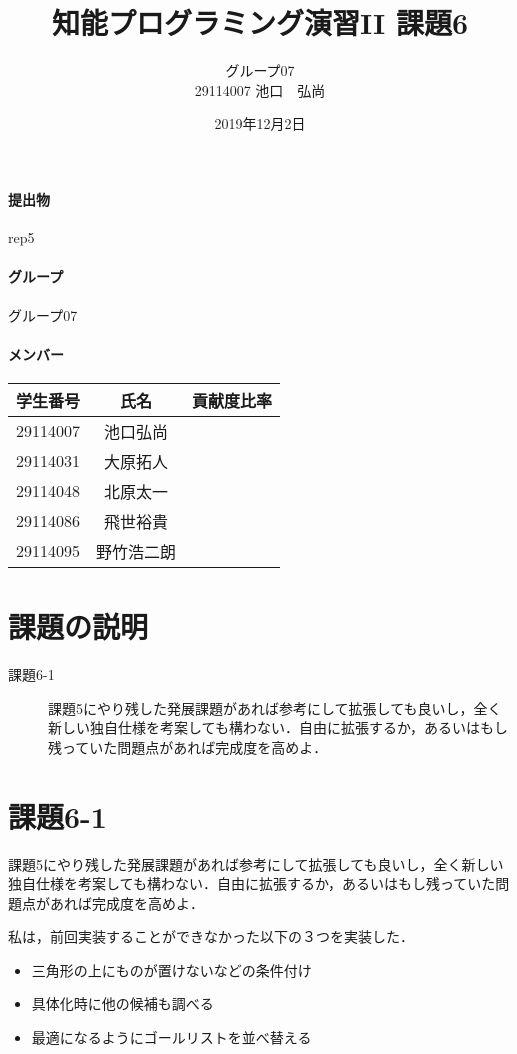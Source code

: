 \documentclass{jarticle}
\title{知能プログラミング演習II 課題6}
\author{グループ07\\
  29114007 池口　弘尚\\
}
\date{2019年12月2日}
\begin{document}
\maketitle

\paragraph{提出物} rep5
\paragraph{グループ} グループ07
\paragraph{メンバー}
\begin{tabular}{|c|c|c|}
  \hline
  学生番号&氏名&貢献度比率\\
  \hline\hline
  29114007&池口弘尚&\\
  \hline
  29114031&大原拓人&\\
  \hline
  29114048&北原太一&\\
  \hline
  29114086&飛世裕貴&\\
  \hline
  29114095&野竹浩二朗&\\
\end{tabular}

\section{課題の説明}
\begin{description}
\item[課題6-1] 課題5にやり残した発展課題があれば参考にして拡張しても良いし，全く新しい独自仕様を考案しても構わない．自由に拡張するか，あるいはもし残っていた問題点があれば完成度を高めよ．
\end{description}

\section{課題6-1}
\begin{screen}
課題5にやり残した発展課題があれば参考にして拡張しても良いし，全く新しい独自仕様を考案しても構わない．自由に拡張するか，あるいはもし残っていた問題点があれば完成度を高めよ．
\end{screen}

私は，前回実装することができなかった以下の３つを実装した．
\begin{itemize}
\item 三角形の上にものが置けないなどの条件付け
\item 具体化時に他の候補も調べる
\item 最適になるようにゴールリストを並べ替える
\end{itemize}
\end{document}
